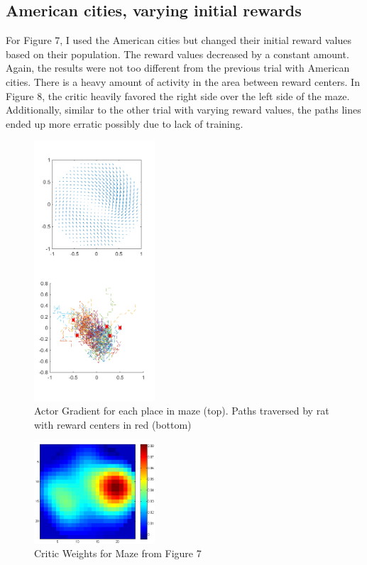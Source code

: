 \documentclass[conference]{IEEEtran}
\begin{document}
\subsection{American cities, varying initial rewards}

For Figure 7, I used the American cities but changed their initial reward values based on their population. The reward values decreased by a constant amount. Again, the results were not too different from the previous trial with American cities. There is a heavy amount of activity in the area between reward centers. In Figure 8, the critic heavily favored the right side over the left side of the maze. Additionally, similar to the other trial with varying reward values, the paths lines ended up more erratic possibly due to lack of training.  

\begin{figure}
\includegraphics[width=0.4\textwidth]{waterMazeRevisedD_Figure_populationRewards.png} 
\caption{Actor Gradient for each place in maze (top). Paths traversed by rat with reward centers in red (bottom)}
\end{figure}

\begin{figure}
\includegraphics[width=0.4\textwidth]{waterMazeRevisedD_Critic_populationRewards.png} 
\caption{Critic Weights for Maze from Figure 7}
\end{figure}
\end{document}
